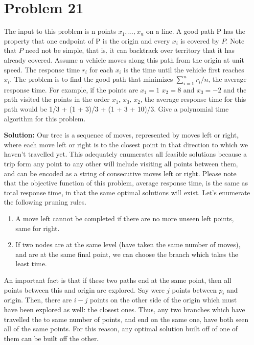 \documentclass{article}
\providecommand{\prob}[1]{\section*{Problem #1}}
\providecommand{\soln}{\textbf{Solution: }}
\begin{document}
\pagebreak
\prob{21}
The input to this problem is n points $x_1, \dots , x_n$ on a line. A good path P has the property that one endpoint of P is the origin and every $x_i$ is covered by $P$. Note that $P$ need not be simple, that is, it can backtrack over territory that it has already covered. Assume a vehicle moves along this path from the origin at unit speed. The response time $r_i$ for each $x_i$ is the time until the vehicle first reaches $x_i$. The problem is to find the good path that minimizes $\sum_{i=1}^n r_i/n$, the average response time.
For example, if the points are $x_1 = 1$ $x_2 = 8$ and $x_3 = −2$ and the path visited the points in the order $x_1$, $x_3$, $x_2$, the average response time for this path would be 1/3 + (1 + 3)/3 + (1 + 3 + 10)/3. Give a polynomial time algorithm for this problem.

\soln Our tree is a sequence of moves, represented by moves left or right, where each move left or right is to the closest point in that direction to which we haven't travelled yet.
This adequately enumerates all feasible solutions because a trip form any point to any other will include visiting all points between them, and can be encoded as a string of consecutive moves left or right.
Please note that the objective function of this problem, average response time, is the same as total response time, in that the same optimal solutions will exist.
Let's enumerate the following pruning rules.

\begin{enumerate}
    \item A move left cannot be completed if there are no more unseen left points, same for right.
    \item If two nodes are at the same level (have taken the same number of moves), and are at the same final point, we can choose the branch which takes the least time.
\end{enumerate}

An important fact is that if these two paths end at the same point, then all points between this and origin are explored.
Say were $j$ points between $p_i$ and origin. Then, there are $i - j$ points on the other side of the origin which must have been explored as well: the closest ones.
Thus, any two branches which have travelled the to same number of points, and end on the same one, have both seen all of the same points.
For this reason, any optimal solution built off of one of them can be built off the other.
\end{document}
